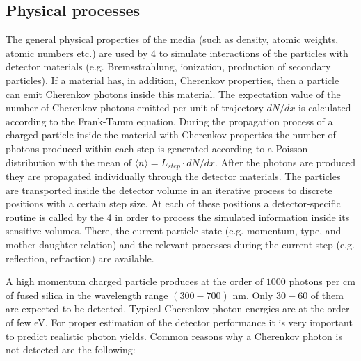 \subsection{Physical processes}

The general physical properties of the media (such as density, atomic weights, atomic numbers etc.) are used by {\geant}4 to simulate interactions of the particles with detector materials (e.g. Bremsstrahlung, ionization, production of secondary particles). If a material has, in addition, Cherenkov properties, then a particle can emit Cherenkov photons inside this material. The expectation value of the number of Cherenkov photons emitted per unit of trajectory $dN/dx$ is calculated according to the Frank-Tamm equation. During the propagation process of a charged particle inside the material with Cherenkov properties the number of photons produced within each step is generated according to a Poisson distribution with the mean of $\langle n \rangle = L_{step} \cdot dN/dx$. After the photons are produced they are propagated individually through the detector materials. The particles are transported inside the detector volume in an iterative process to discrete positions with a certain step size. At each of these positions a detector-specific routine is called by the {\geant}4 in order to process the simulated information inside its sensitive volumes. There, the current particle state (e.g. momentum, type, and mother-daughter relation) and the relevant processes during the current step (e.g. reflection, refraction) are available.

A high momentum charged particle produces at the order of $1000$ photons per cm of fused silica in the wavelength range $(300-700)$ nm. Only $30-60$ of them are expected to be detected. Typical Cherenkov photon energies are at the order of few eV. For proper estimation of the detector performance it is very important to predict realistic photon yields. Common reasons why a Cherenkov photon is not detected are the following:

